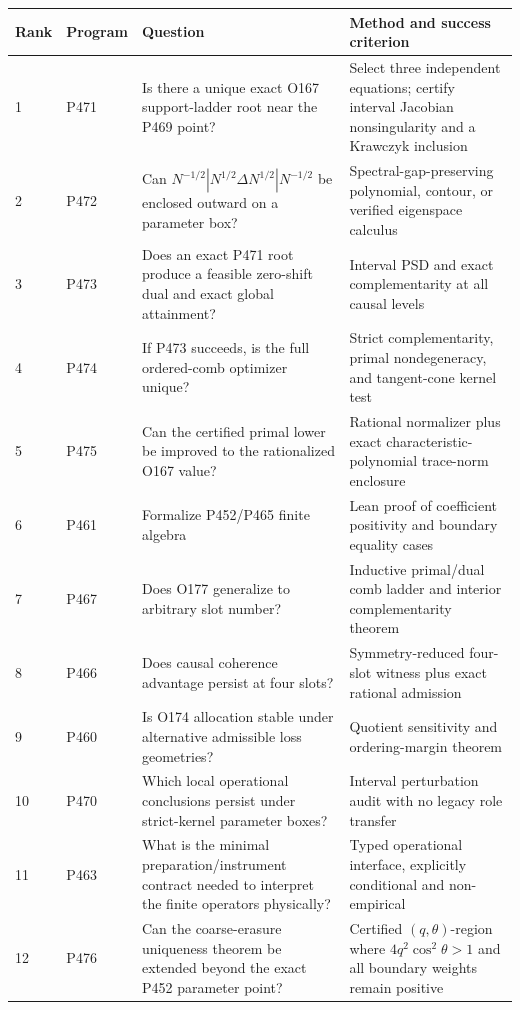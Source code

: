 \documentclass[11pt,a4paper,openany]{report}
\begin{document}
\begin{center}
\begingroup\small
\setlength{\tabcolsep}{2.5pt}
\renewcommand{\arraystretch}{1.16}
\begin{longtable}{@{}p{}p{}p{}p{}@{}}
\toprule
\textbf{Rank} & \textbf{Program} & \textbf{Question} & \textbf{Method and success criterion} \\
\midrule
\endhead
1 & P471 & Is there a unique exact O167 support-ladder root near the P469 point? & Select three independent equations; certify interval Jacobian nonsingularity and a Krawczyk inclusion \\
2 & P472 & Can \(N^{-1/2}|N^{1/2}\Delta N^{1/2}|N^{-1/2}\) be enclosed outward on a parameter box? & Spectral-gap-preserving polynomial, contour, or verified eigenspace calculus \\
3 & P473 & Does an exact P471 root produce a feasible zero-shift dual and exact global attainment? & Interval PSD and exact complementarity at all causal levels \\
4 & P474 & If P473 succeeds, is the full ordered-comb optimizer unique? & Strict complementarity, primal nondegeneracy, and tangent-cone kernel test \\
5 & P475 & Can the certified primal lower be improved to the rationalized O167 value? & Rational normalizer plus exact characteristic-polynomial trace-norm enclosure \\
6 & P461 & Formalize P452/\allowbreak{}P465 finite algebra & Lean proof of coefficient positivity and boundary equality cases \\
7 & P467 & Does O177 generalize to arbitrary slot number? & Inductive primal/\allowbreak{}dual comb ladder and interior complementarity theorem \\
8 & P466 & Does causal coherence advantage persist at four slots? & Symmetry-reduced four-slot witness plus exact rational admission \\
9 & P460 & Is O174 allocation stable under alternative admissible loss geometries? & Quotient sensitivity and ordering-margin theorem \\
10 & P470 & Which local operational conclusions persist under strict-kernel parameter boxes? & Interval perturbation audit with no legacy role transfer \\
11 & P463 & What is the minimal preparation/\allowbreak{}instrument contract needed to interpret the finite operators physically? & Typed operational interface, explicitly conditional and non-empirical \\
12 & P476 & Can the coarse-erasure uniqueness theorem be extended beyond the exact P452 parameter point? & Certified \((q,\theta)\)-region where \(4q^2\cos^2\theta>1\) and all boundary weights remain positive \\
\bottomrule
\end{longtable}
\endgroup
\end{center}
\end{document}
